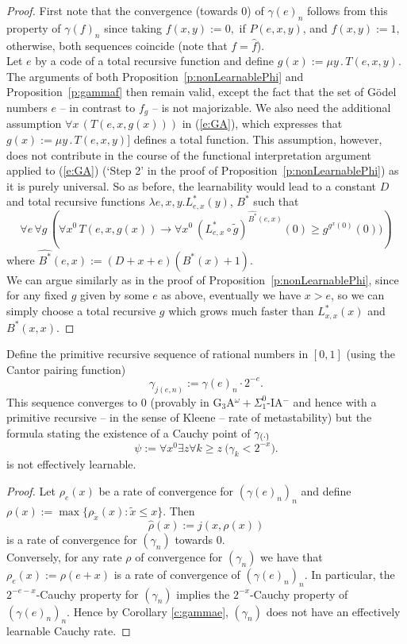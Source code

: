 \begin{proof}
First note that the convergence (towards $0$) 
of $\gamma(e)_n$ follows from this property of $\gamma(f)_n$ 
since taking $f(x,y):=0,$ if $P(e,x,y)$, 
and $f(x,y):=1,$ otherwise, both sequences coincide (note that 
$f=\widehat{f}$).\\ 
Let $e$ by a code of a total recursive function and define $g(x):=\mu 
y\,.\,T(e,x,y).$
The arguments of both Proposition~\ref{p:nonLearnablePhi} and Proposition~\ref{p:gammaf} then remain valid,
except the fact that the set of 
G\"odel numbers $e$ -- in contrast to $f_g$  -- is not majorizable. 
We also need the additional assumption $\forall x\,(T(e,x,g(x)))$ in 
(\ref{e:GA}), which 
expresses that $g(x):=\mu y\,.\,T(e,x,y)]$ defines a total function. This 
assumption, however, does not contribute in the course of the functional 
interpretation argument applied to (\ref{e:GA}) (`Step 2' in the proof of 
Proposition~\ref{p:nonLearnablePhi}) as it is purely universal. 
So as before, the learnability would lead to a constant $D$ and 
total recursive functions $\lambda e,x,y.
L^*_{e,x}(y)$, $B^*$ such that
\[ \forall e\,\forall g\,\left(\forall x^0 \,T(e,x,g(x))\rightarrow 
\forall x^0\ (L^*_{e,x}\circ \tilde{g})^{\widehat{B^*}(e,x)}(0)
\geq g^{g^{x}(0)}(0))\right)\] where 
$\widehat{B^*}(e,x):=(D+x+e)(B^*(x)+1).$  \\ 
We can argue similarly as in the proof of Proposition~\ref{p:nonLearnablePhi}, 
since for any fixed $g$ given by some $e$ as above, eventually we have $x>e$, 
so we can simply choose
a total recursive $g$ which grows much faster than $L^*_{x,x}(x)$ 
and $B^*(x,x)$.
\end{proof}

\begin{cor}\label{c:gammaee}
Define the primitive recursive sequence of rational numbers in $[0,1]$  
(using the Cantor pairing function)
\[
\gamma_{j(e,n)}:= \gamma(e)_n\cdot 2^{-e}.
\]
This sequence converges to $0$ (provably in {\rm 
G$_3$A$^{\omega}+\Sigma^0_1$-IA$^-$} and hence with a primitive recursive -- 
in the sense of Kleene -- rate of metastability) but 
the formula stating the existence of a Cauchy point of $\gamma_{(\cdot)}$
\[
\psi:=\forall x^0\exists z \forall k\geq z\ \big( \gamma_k<2^{-x} \big).
\]
is not effectively learnable.
\end{cor}
\begin{proof} 
Let $\rho_e(x)$ be a rate of convergence for $(\gamma(e)_n)_n$ and define 
$\rho(x):=\max\{ \rho_{\tilde{x}}(x):\tilde{x}\le x\}.$ Then 
\[ \widehat{\rho}(x):=j(x,\rho(x)) \] is a rate of convergence for 
$(\gamma_n)$ towards $0.$
\\
Conversely, for any rate $\rho$ of convergence for $(\gamma_n)$ we have that 
$\rho_e(x):=\rho(e+x)$ is a rate of convergence of $(\gamma(e)_n)_n$. In 
particular, the $2^{-e-x}$-Cauchy property for $(\gamma_n)$ implies the 
$2^{-x}$-Cauchy property of $(\gamma(e)_n)_n.$ Hence by Corollary 
\ref{c:gammae}, 
$(\gamma_n)$ does not have an effectively learnable Cauchy rate.
\end{proof}


